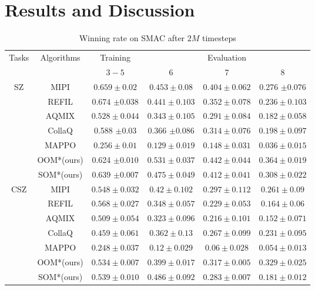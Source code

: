 \documentclass[10pt]{article} %
\begin{document}
\section{Results and Discussion} \label{results_section}

\begin{table}[ht]
\renewcommand{\arraystretch}{1.3} %
\caption[]{Winning rate on SMAC after $2M$ timesteps}
  \label{table-results1}
  \centering
\begin{tabular}{cccccc}
\hline \multirow{2}{*}{ Tasks } & \multirow{2}{*}{ Algorithms } & Training & \multicolumn{3}{c}{ Evaluation } \\
\cline { 4 - 6 } & & $3-5$ & 6 & 7 & 8 \\
 \hline \multirow{7}{*}{SZ} & MIPI  & $0.659 \pm 0.02$ & $0.453 \pm 0.08$ & $0.404 \pm 0.062$ & 0.276 $\pm 0.076$ \\
\cline { 2 - 6 } & REFIL  & $\mathbf{0.674}$ $\pm 0.038$ & $0.441 \pm 0.103$ & $0.352 \pm 0.078$ & $0.236 \pm 0.103$ \\
\cline { 2 - 6 } & AQMIX  & $0.528 \pm 0.044$ & $0.343 \pm 0.105$ & $0.291 \pm 0.084$ & $0.182 \pm 0.058$ \\
\cline { 2 - 6 } & CollaQ  & 0.588 $\pm 0.03$ & 0.366 $\pm 0.086$ & $0.314 \pm 0.076$ & $0.198 \pm 0.097$ \\
\cline { 2 - 6 } & MAPPO  & $0.256 \pm 0.01$ & $0.129 \pm 0.019$ & $0.148 \pm 0.031$ & $0.036 \pm 0.015$ \\
\cline { 2 - 6 } & OOM*(ours) & 0.624 $\pm 0.010$ & $\mathbf{0.531} \pm 0.037$ & $\mathbf{0.442} \pm 0.044$ & $\mathbf{0.364} \pm 0.019$ \\ %
  \cline { 2 - 6 } & SOM*(ours) & 0.639 $\pm 0.007$ & $0.475 \pm 0.049$ & $0.412 \pm 0.041$ & $0.308 \pm 0.022$ \\ %

\hline \multirow{7}{*}{CSZ} & MIPI  & $0.548 \pm 0.032$ & $0.42 \pm 0.102$ & $0.297 \pm 0.112$ & $0.261 \pm 0.09$ \\
\cline { 2 - 6 } & REFIL & $\mathbf{0.568} \pm 0.027$ & $0.348 \pm 0.057$ & $0.229 \pm 0.053$ & $0.164 \pm 0.06$ \\
\cline { 2 - 6 } & AQMIX & $0.509 \pm 0.054$ & $0.323 \pm 0.096$ & $0.216 \pm 0.101$ & $0.152 \pm 0.071$ \\
\cline { 2 - 6 } & CollaQ & $0.459 \pm 0.061$ & $0.362 \pm 0.13$ & $0.267 \pm 0.099$ & $0.231 \pm 0.095$ \\
\cline { 2 - 6 } & MAPPO & $0.248 \pm 0.037$ & $0.12 \pm 0.029$ & $0.06 \pm 0.028$ & $0.054 \pm 0.013$ \\
\cline { 2 - 6 } & OOM*(ours) & $0.534\pm 0.007$ & $0.399 \pm 0.017$ & $\mathbf{0.317} \pm 0.005$ & $\mathbf{0.329} \pm 0.025$ \\ %
  \cline { 2 - 6 } & SOM*(ours) & $0.539 \pm 0.010$ & $\mathbf{0.486} \pm 0.092$ & $0.283 \pm 0.007$ & $0.181 \pm 0.012$ \\ %


\end{tabular}
\end{table}
\end{document}
